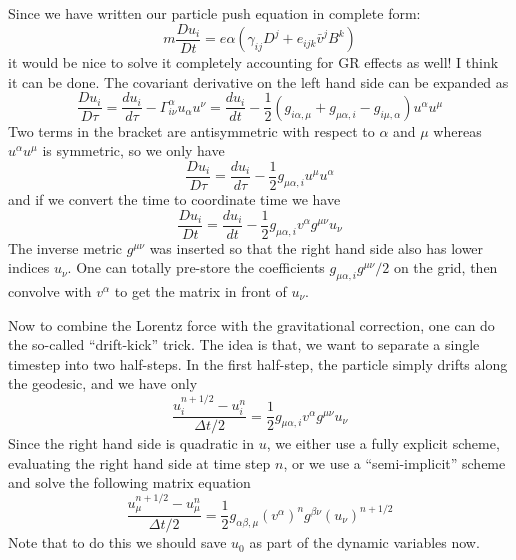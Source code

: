 Since we have written our particle push equation in complete form:
\begin{equation}
  \label{eq:51}
  m\frac{Du_i}{Dt} = e\alpha (\gamma_{ij}D^j + e_{ijk}\bar{v}^jB^k)
\end{equation}
it would be nice to solve it completely accounting for GR effects as well! I
think it can be done. The covariant derivative on the left hand side can be
expanded as
\begin{equation}
  \label{eq:52}
  \frac{Du_i}{D\tau} = \frac{du_i}{d\tau} - \Gamma^{\alpha}_{i\nu}u_{\alpha}u^{\nu} = \frac{du_i}{dt} - \frac{1}{2}\left( g_{i\alpha,\mu} + g_{\mu\alpha,i} - g_{i\mu,\alpha} \right)u^{\alpha}u^{\mu}
\end{equation}
Two terms in the bracket are antisymmetric with respect to $\alpha$ and $\mu$
whereas $u^{\alpha}u^{\mu}$ is symmetric, so we only have
\begin{equation}
  \label{eq:53}
  \frac{Du_i}{D\tau} = \frac{du_i}{d\tau} - \frac{1}{2}g_{\mu\alpha,i}u^{\mu}u^{\alpha}
\end{equation}
and if we convert the time to coordinate time we have
\begin{equation}
  \label{eq:54}
  \frac{Du_i}{Dt} = \frac{du_i}{dt} - \frac{1}{2}g_{\mu\alpha,i}v^{\alpha}g^{\mu\nu}u_{\nu}
\end{equation}
The inverse metric $g^{\mu\nu}$ was inserted so that the right hand side also
has lower indices $u_{\nu}$. One can totally pre-store the coefficients
$g_{\mu\alpha,i}g^{\mu\nu}/2$ on the grid, then convolve with $v^{\alpha}$ to
get the matrix in front of $u_{\nu}$.

Now to combine the Lorentz force with the gravitational correction, one can do
the so-called ``drift-kick'' trick. The idea is that, we want to separate a
single timestep into two half-steps. In the first half-step, the particle simply
drifts along the geodesic, and we have only
\begin{equation}
  \label{eq:55}
  \frac{u_i^{n+1/2} - u_i^n}{\Delta t/2} = \frac{1}{2}g_{\mu\alpha,i}v^{\alpha}g^{\mu\nu}u_{\nu}
\end{equation}
Since the right hand side is quadratic in $u$, we either use a fully explicit
scheme, evaluating the right hand side at time step $n$, or we use a
``semi-implicit'' scheme and solve the following matrix equation
\begin{equation}
  \label{eq:56}
  \frac{u_{\mu}^{n+1/2} - u_{\mu}^n}{\Delta t/2} = \frac{1}{2}g_{\alpha\beta,\mu}(v^{\alpha})^ng^{\beta\nu}(u_{\nu})^{n+1/2}
\end{equation}
Note that to do this we should save $u_0$ as part of the dynamic variables now.

